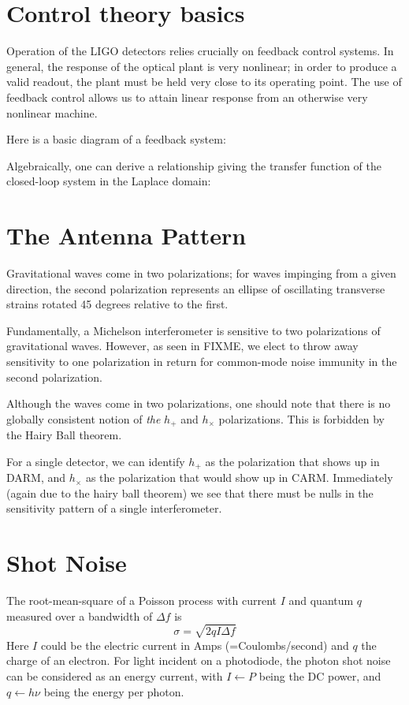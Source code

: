 \section{Control theory basics}

Operation of the LIGO detectors relies crucially on feedback control
systems.  In general, the response of the optical plant is very
nonlinear; in order to produce a valid readout, the plant must be held
very close to its operating point.  The use of feedback control allows
us to attain linear response from an otherwise very nonlinear machine.

Here is a basic diagram of a feedback system:

Algebraically, one can derive a relationship giving the transfer function
of the closed-loop system in the Laplace domain:

\section{The Antenna Pattern}

Gravitational waves come in two polarizations; for waves impinging
from a given direction, the second polarization represents an ellipse
of oscillating transverse strains rotated 45 degrees relative to the
first.  

Fundamentally, a Michelson interferometer is sensitive to two
polarizations of gravitational waves.  However, as seen in FIXME, we
elect to throw away sensitivity to one polarization in return for
common-mode noise immunity in the second polarization.

Although the waves come in two polarizations, one should note that
there is no globally consistent notion of \emph{the} $h_+$ and
$h_\times$ polarizations.  This is forbidden by the Hairy Ball
theorem.  

For a single detector, we can identify $h_+$ as the polarization
that shows up in DARM, and $h_\times$ as the polarization that would
show up in CARM.  Immediately (again due to the hairy ball theorem) we
see that there must be nulls in the sensitivity pattern of a single
interferometer.

\section{Shot Noise}
The root-mean-square of a Poisson process with current $I$ and quantum
$q$ measured over a bandwidth of $\Delta f$ is 
$$\sigma = \sqrt{2 q I \Delta f}$$ 
Here $I$ could be the electric current in Amps (=Coulombs/second) and
$q$ the charge of an electron.  For light incident on a photodiode,
the photon shot noise can be considered as an energy current, with
$I\leftarrow P$ being the DC power, and $q\leftarrow h\nu$ being the
energy per photon.

